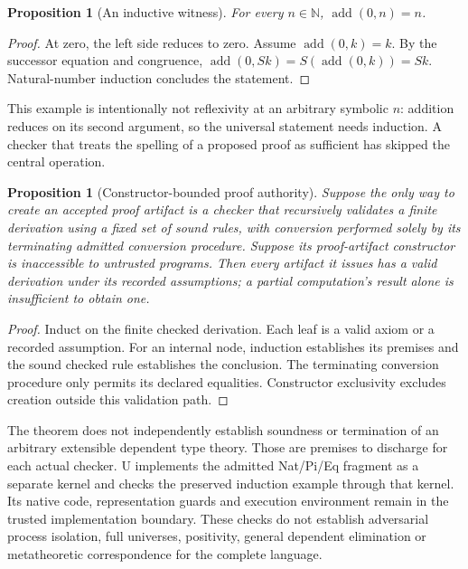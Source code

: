 \documentclass[11pt]{article}
\newtheorem{proposition}[definition]{Proposition}
\theoremstyle{remark}
\newcommand{\N}{\mathbb{N}}
\begin{document}
\begin{proposition}[An inductive witness]
For every $n\in\N$, $\operatorname{add}(0,n)=n$.
\end{proposition}
\begin{proof}
At zero, the left side reduces to zero. Assume
$\operatorname{add}(0,k)=k$. By the successor equation and congruence,
$\operatorname{add}(0,Sk)=S(\operatorname{add}(0,k))=Sk$. Natural-number
induction concludes the statement.
\end{proof}

This example is intentionally not reflexivity at an arbitrary symbolic
$n$: addition reduces on its second argument, so the universal statement
needs induction. A checker that treats the spelling of a proposed proof
as sufficient has skipped the central operation.

\begin{proposition}[Constructor-bounded proof authority]
Suppose the only way to create an accepted proof artifact is a checker that
recursively validates a finite derivation using a fixed set of sound rules,
with conversion performed solely by its terminating admitted conversion
procedure. Suppose its proof-artifact constructor is inaccessible to
untrusted programs. Then every artifact it issues has a valid derivation
under its recorded assumptions; a partial computation's result alone is
insufficient to obtain one.
\end{proposition}
\begin{proof}
Induct on the finite checked derivation. Each leaf is a valid axiom or a
recorded assumption. For an internal node, induction establishes its
premises and the sound checked rule establishes the conclusion. The
terminating conversion procedure only permits its declared equalities.
Constructor exclusivity excludes creation outside this validation path.
\end{proof}

The theorem does not independently establish soundness or termination of an
arbitrary extensible dependent type theory. Those are premises to discharge
for each actual checker. U implements the admitted Nat/Pi/Eq fragment as a
separate kernel and checks the preserved induction example through that
kernel. Its native code, representation guards and execution environment
remain in the trusted implementation boundary. These checks do not establish
adversarial process isolation, full universes, positivity, general dependent
elimination or metatheoretic correspondence for the complete language.
\end{document}
